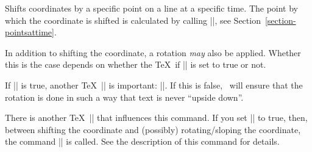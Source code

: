 \begin{command}{\pgftransformlineattime{}}
    Shifts coordinates by a specific point on a line at a specific time. The
    point by which the coordinate is shifted is calculated by calling
    |\pgfpointlineattime|, see Section~\ref{section-pointsattime}.

    In addition to shifting the coordinate, a rotation \emph{may} also be
    applied. Whether this is the case depends on whether the \TeX\ if
    |\ifpgfslopedattime| is set to true or not.
\begin{codeexample}[]
\end{codeexample}
\begin{codeexample}[]
\end{codeexample}
    If |\ifpgfslopedattime| is true, another \TeX\ |\if| is important:
    |\ifpgfallowupsidedowattime|. If this is false, \pgfname\ will ensure that
    the rotation is done in such a way that text is never ``upside down''.

    There is another \TeX\ |\if| that influences this command. If you set
    |\ifpgfresetnontranslationattime| to true, then, between shifting the
    coordinate and (possibly) rotating/sloping the coordinate, the command
    |\pgftransformresetnontranslations| is called. See the description of this
    command for details.
\begin{codeexample}[]
\end{codeexample}
\begin{codeexample}[]
\end{codeexample}
\end{command}

